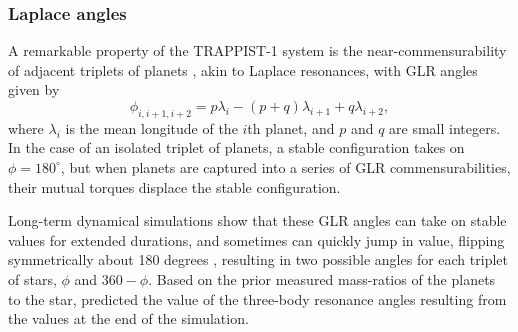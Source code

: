 \documentclass[fleqn,usenatbib]{mnras} %
\begin{document}



\subsubsection{Laplace angles}

A remarkable property of the TRAPPIST-1 system is the near-commensurability
of adjacent triplets of planets \citep{Luger2017b}, akin to Laplace resonances, with
GLR angles given by
\begin{equation}
    \phi_{i,i+1,i+2} = p \lambda_i - (p+q) \lambda_{i+1} + q \lambda_{i+2},
\end{equation}
where $\lambda_i$ is the mean longitude of the $i$th planet, and $p$ and
$q$ are small integers.  In
the case of an isolated triplet of planets, a stable configuration takes
on $\phi = 180^\circ$, but when planets are captured into a series of GLR
commensurabilities, their mutual torques displace the stable configuration.

Long-term
dynamical simulations show that these GLR angles can take on stable values
for extended durations, and sometimes can quickly jump in value, flipping symmetrically about 
180 degrees \citep{Mah2018},
resulting in two possible angles for each triplet of stars, $\phi$ and $360-\phi$.
Based on the prior measured mass-ratios of the planets to the star, \citet{Mah2018}
predicted the value of the three-body resonance angles resulting from the values at the
end of the simulation.  

\end{document}
